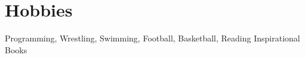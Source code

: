 \documentclass[a4paper,10pt]{article}
\begin{document}
	\section{Hobbies}
		{\hspace{1 mm} Programming, Wrestling, Swimming, Football, Basketball, Reading Inspirational  Books}\\%
			
	
	
\end{document}

